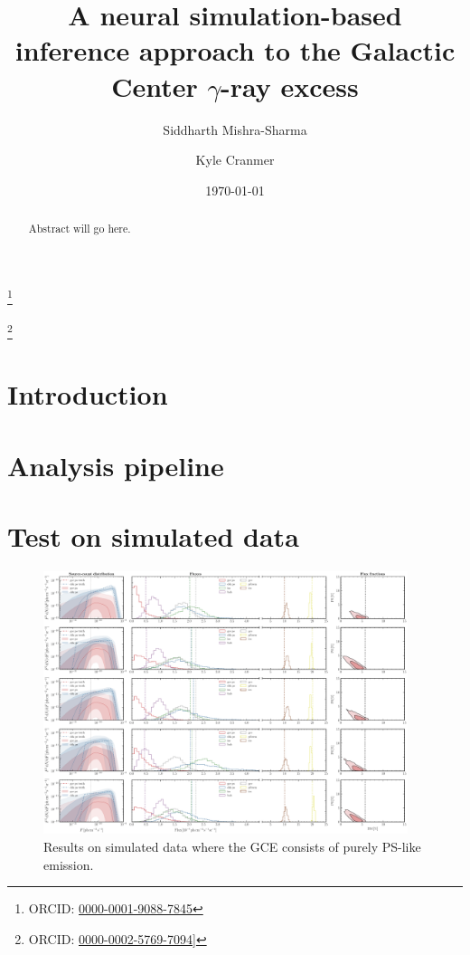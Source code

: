 \documentclass[prd,aps,10pt,nofootinbib,twocolumn,superscriptaddress,preprintnumbers,balancelastpage,longbibliography]{revtex4-1}
\begin{document}
\title{A neural simulation-based inference approach to the Galactic Center $\gamma$-ray excess}
 
\author{Siddharth Mishra-Sharma}
\thanks{ORCID: \href{https://orcid.org/0000-0001-9088-7845}{0000-0001-9088-7845}}

\author{Kyle Cranmer}
\thanks{ORCID: \href{https://orcid.org/0000-0002-5769-7094]}{0000-0002-5769-7094]}}

\date{\today}

\begin{abstract}
Abstract will go here.
\end{abstract}

\maketitle

\section{Introduction}
\label{sec:intro}

\section{Analysis pipeline}
\label{sec:analysis}

\section{Test on simulated data}
\label{sec:simulations}

%
\begin{figure}
    \centering
    \includegraphics[width=0.95\textwidth]{plots/sim_sbi_dm.pdf}
    \caption{Results on simulated data where the GCE consists of purely PS-like emission.}
    \label{fig:sim_sbi_dm}
\end{figure}
%
\end{document}
